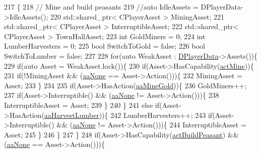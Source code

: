 \begin{DoxyCode}
217                                                                               \{
218     \textcolor{comment}{// Mine and build peasants}
219     \textcolor{comment}{//auto IdleAssets = DPlayerData->IdleAssets();}
220     std::shared\_ptr< CPlayerAsset > MiningAsset;
221     std::shared\_ptr< CPlayerAsset > InterruptibleAsset;
222     std::shared\_ptr< CPlayerAsset > TownHallAsset;
223     \textcolor{keywordtype}{int} GoldMiners = 0;
224     \textcolor{keywordtype}{int} LumberHarvesters = 0;
225     \textcolor{keywordtype}{bool} SwitchToGold = \textcolor{keyword}{false};
226     \textcolor{keywordtype}{bool} SwitchToLumber = \textcolor{keyword}{false};
227     
228     \textcolor{keywordflow}{for}(\textcolor{keyword}{auto} WeakAsset : \hyperlink{classCAIPlayer_a83b5113c8f7e80df54940b647c5ee2e6}{DPlayerData}->Assets())\{
229         \textcolor{keywordflow}{if}(\textcolor{keyword}{auto} Asset = WeakAsset.lock())\{
230             \textcolor{keywordflow}{if}(Asset->HasCapability(\hyperlink{GameDataTypes_8h_a35b98ce26aca678b03c6f9f76e4778cea2e0db284fd05caa56e3867c661ccdd8b}{actMine}))\{
231                 \textcolor{keywordflow}{if}(!MiningAsset && (\hyperlink{GameDataTypes_8h_ab47668e651a3032cfb9c40ea2d60d670ac17cc5a0035320c060d7f8074143b507}{aaNone} == Asset->Action()))\{
232                     MiningAsset = Asset;
233                 \}
234                 
235                 \textcolor{keywordflow}{if}(Asset->HasAction(\hyperlink{GameDataTypes_8h_ab47668e651a3032cfb9c40ea2d60d670abc45b1c4fbca1481e373a780a69bd56b}{aaMineGold}))\{
236                     GoldMiners++; 
237                     \textcolor{keywordflow}{if}(Asset->Interruptible() && (\hyperlink{GameDataTypes_8h_ab47668e651a3032cfb9c40ea2d60d670ac17cc5a0035320c060d7f8074143b507}{aaNone} != Asset->Action()))\{
238                         InterruptibleAsset = Asset;
239                     \}
240                 \}
241                 \textcolor{keywordflow}{else} \textcolor{keywordflow}{if}(Asset->HasAction(\hyperlink{GameDataTypes_8h_ab47668e651a3032cfb9c40ea2d60d670a4c44c3d83b3b67a8dd2248d11bedd0ee}{aaHarvestLumber}))\{
242                     LumberHarvesters++;
243                     \textcolor{keywordflow}{if}(Asset->Interruptible() && (\hyperlink{GameDataTypes_8h_ab47668e651a3032cfb9c40ea2d60d670ac17cc5a0035320c060d7f8074143b507}{aaNone} != Asset->Action()))\{
244                         InterruptibleAsset = Asset;
245                     \}
246                 \}
247             \}
248             \textcolor{keywordflow}{if}(Asset->HasCapability(\hyperlink{GameDataTypes_8h_a35b98ce26aca678b03c6f9f76e4778cea66c601dce0fc095460b3c2c25f66ee71}{actBuildPeasant}) && (\hyperlink{GameDataTypes_8h_ab47668e651a3032cfb9c40ea2d60d670ac17cc5a0035320c060d7f8074143b507}{aaNone} == Asset->Action()))\{

\end{DoxyCode}
